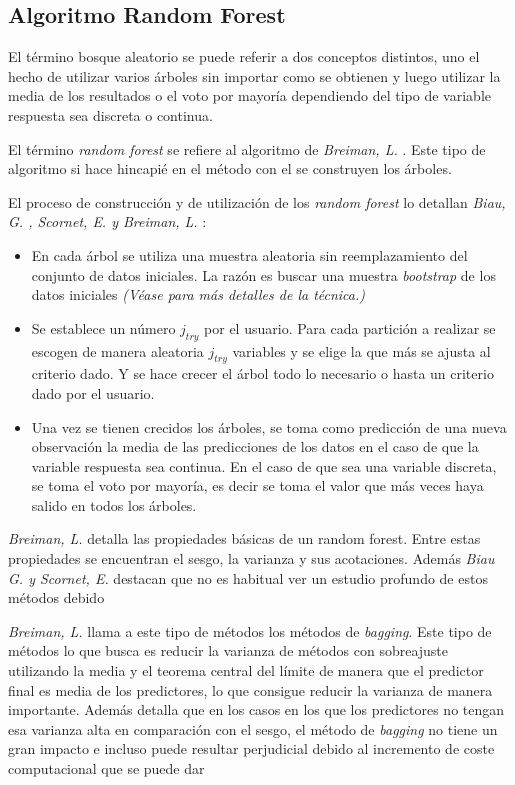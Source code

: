 \subsection{Algoritmo Random Forest}

\noindent El término bosque aleatorio se puede referir a dos conceptos distintos, uno el hecho de utilizar varios árboles sin importar como se obtienen y luego utilizar la media de los resultados o el voto por mayoría dependiendo del tipo de variable respuesta sea discreta o continua. 

\noindent El término \emph{random forest} se refiere al algoritmo de \emph{Breiman, L.} \cite{Breiman 2001}. Este tipo de algoritmo si hace hincapié en el  método con el se construyen los árboles. 

\noindent El proceso de construcción y de utilización de los \emph{random forest} lo detallan \emph{Biau, G. , Scornet, E. y Breiman, L.}\cite{Biau 2016,Breiman 2004} :
\begin{itemize}
\item En cada árbol se utiliza una muestra aleatoria sin reemplazamiento del conjunto de datos iniciales. La razón es buscar una muestra \emph{bootstrap} de los datos iniciales \emph{(Véase \cite{Hesterberg 2011} para más detalles de la técnica.)}
\item Se establece un número $j_{try}$ por el usuario. Para cada partición a realizar se escogen de manera aleatoria $j_{try}$ variables y se elige la que más se ajusta al criterio dado. Y se hace crecer el árbol todo lo necesario o hasta un criterio dado por el usuario. 
 
\item Una vez se tienen crecidos los árboles, se toma como predicción de una nueva observación la media de las predicciones de los datos en el caso de que la variable respuesta sea continua. En el caso de que sea una variable discreta, se toma el voto por mayoría, es decir se toma el valor que más veces haya salido en todos los árboles. 
\end{itemize}

\noindent \emph{Breiman, L.} \cite {Breiman 2004} detalla las propiedades básicas de un random forest. Entre estas propiedades se encuentran el sesgo, la varianza y sus acotaciones. Además \emph{Biau G. y Scornet, E. }\cite{Biau 2016} destacan que no es habitual ver un estudio profundo de estos métodos debido 

\noindent \emph{Breiman, L.} \cite{Breiman 1996} llama a este tipo de métodos los métodos de \emph{bagging}. Este tipo de métodos lo que busca es reducir la varianza de métodos con sobreajuste utilizando la media y el teorema central del límite de manera que el predictor final es media de los predictores, lo que consigue reducir la varianza de manera importante. Además detalla que en los casos en los que los predictores no tengan esa varianza alta en comparación con el sesgo, el método de \emph{bagging} no tiene un gran impacto e incluso puede resultar perjudicial debido al incremento de coste computacional que se puede dar